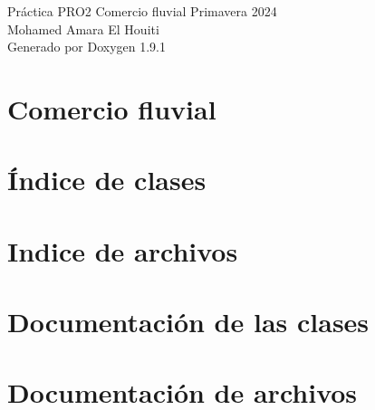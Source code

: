\let\mypdfximage\pdfximage\def\pdfximage{\immediate\mypdfximage}\documentclass[twoside]{book}
\newcommand{\+}{\discretionary{\mbox{\scriptsize$\hookleftarrow$}}{}{}}
\newcommand{\clearemptydoublepage}{%
  \newpage{\pagestyle{empty}\cleardoublepage}%
}
\begin{document}
\raggedbottom

\hypersetup{pageanchor=false,
             bookmarksnumbered=true,
             pdfencoding=unicode
            }
\begin{titlepage}
\vspace*{7cm}
\begin{center}%
{\Large Práctica PRO2 Comercio fluvial Primavera 2024 \\[1ex]\large Mohamed Amara El Houiti }\\
\vspace*{1cm}
{\large Generado por Doxygen 1.9.1}\\
\end{center}
\end{titlepage}
\clearemptydoublepage
{}
\tableofcontents
\clearemptydoublepage
{}
\hypersetup{pageanchor=true}

\chapter{Comercio fluvial}
\label{index}\hypertarget{index}{}
\chapter{Índice de clases}

\chapter{Indice de archivos}

\chapter{Documentación de las clases}





\chapter{Documentación de archivos}












\backmatter
\newpage
{}
\clearemptydoublepage
{}
\printindex
\end{document}
